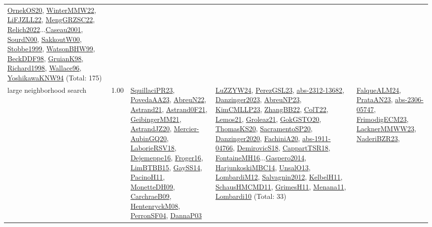 {\begin{longtable}{p{3cm}r>{\raggedright\arraybackslash}p{6cm}>{\raggedright\arraybackslash}p{6cm}>{\raggedright\arraybackslash}p{8cm}}
\hyperref[detail:OrnekOS20]{OrnekOS20}, \hyperref[detail:WinterMMW22]{WinterMMW22}, \hyperref[detail:LiFJZLL22]{LiFJZLL22}, \hyperref[detail:MengGRZSC22]{MengGRZSC22}, \hyperref[detail:Relich2022]{Relich2022}...\hyperref[detail:Caseau2001]{Caseau2001}, \hyperref[detail:SourdN00]{SourdN00}, \hyperref[detail:SakkoutW00]{SakkoutW00}, \hyperref[detail:Stobbe1999]{Stobbe1999}, \hyperref[detail:WatsonBHW99]{WatsonBHW99}, \hyperref[detail:BeckDDF98]{BeckDDF98}, \hyperref[detail:GruianK98]{GruianK98}, \hyperref[detail:Richard1998]{Richard1998}, \hyperref[detail:Wallace96]{Wallace96}, \hyperref[detail:YoshikawaKNW94]{YoshikawaKNW94} (Total: 175)\\
\index{large neighborhood search}\index{Algorithms!large neighborhood search}large neighborhood search &  1.00 & \hyperref[detail:SquillaciPR23]{SquillaciPR23}, \hyperref[detail:PovedaAA23]{PovedaAA23}, \hyperref[detail:AbreuN22]{AbreuN22}, \hyperref[detail:Astrand21]{Astrand21}, \hyperref[detail:Astrand0F21]{Astrand0F21}, \hyperref[detail:GeibingerMM21]{GeibingerMM21}, \hyperref[detail:AstrandJZ20]{AstrandJZ20}, \hyperref[detail:Mercier-AubinGQ20]{Mercier-AubinGQ20}, \hyperref[detail:LaborieRSV18]{LaborieRSV18}, \hyperref[detail:Dejemeppe16]{Dejemeppe16}, \hyperref[detail:Froger16]{Froger16}, \hyperref[detail:LimBTBB15]{LimBTBB15}, \hyperref[detail:GaySS14]{GaySS14}, \hyperref[detail:PacinoH11]{PacinoH11}, \hyperref[detail:MonetteDH09]{MonetteDH09}, \hyperref[detail:CarchraeB09]{CarchraeB09}, \hyperref[detail:HentenryckM08]{HentenryckM08}, \hyperref[detail:PerronSF04]{PerronSF04}, \hyperref[detail:DannaP03]{DannaP03} & \hyperref[detail:LuZZYW24]{LuZZYW24}, \hyperref[detail:PerezGSL23]{PerezGSL23}, \hyperref[detail:abs-2312-13682]{abs-2312-13682}, \hyperref[detail:Danzinger2023]{Danzinger2023}, \hyperref[detail:AbreuNP23]{AbreuNP23}, \hyperref[detail:KimCMLLP23]{KimCMLLP23}, \hyperref[detail:ZhangBB22]{ZhangBB22}, \hyperref[detail:ColT22]{ColT22}, \hyperref[detail:Lemos21]{Lemos21}, \hyperref[detail:Groleaz21]{Groleaz21}, \hyperref[detail:GokGSTO20]{GokGSTO20}, \hyperref[detail:ThomasKS20]{ThomasKS20}, \hyperref[detail:SacramentoSP20]{SacramentoSP20}, \hyperref[detail:Danzinger2020]{Danzinger2020}, \hyperref[detail:FachiniA20]{FachiniA20}, \hyperref[detail:abs-1911-04766]{abs-1911-04766}, \hyperref[detail:DemirovicS18]{DemirovicS18}, \hyperref[detail:CappartTSR18]{CappartTSR18}, \hyperref[detail:FontaineMH16]{FontaineMH16}...\hyperref[detail:Gaspero2014]{Gaspero2014}, \hyperref[detail:HarjunkoskiMBC14]{HarjunkoskiMBC14}, \hyperref[detail:UnsalO13]{UnsalO13}, \hyperref[detail:LombardiM12]{LombardiM12}, \hyperref[detail:Salvagnin2012]{Salvagnin2012}, \hyperref[detail:KelbelH11]{KelbelH11}, \hyperref[detail:SchausHMCMD11]{SchausHMCMD11}, \hyperref[detail:GrimesH11]{GrimesH11}, \hyperref[detail:Menana11]{Menana11}, \hyperref[detail:Lombardi10]{Lombardi10} (Total: 33) & \hyperref[detail:FalqueALM24]{FalqueALM24}, \hyperref[detail:PrataAN23]{PrataAN23}, \hyperref[detail:abs-2306-05747]{abs-2306-05747}, \hyperref[detail:FrimodigECM23]{FrimodigECM23}, \hyperref[detail:LacknerMMWW23]{LacknerMMWW23}, \hyperref[detail:NaderiBZR23]{NaderiBZR23}, 
\end{longtable}}
